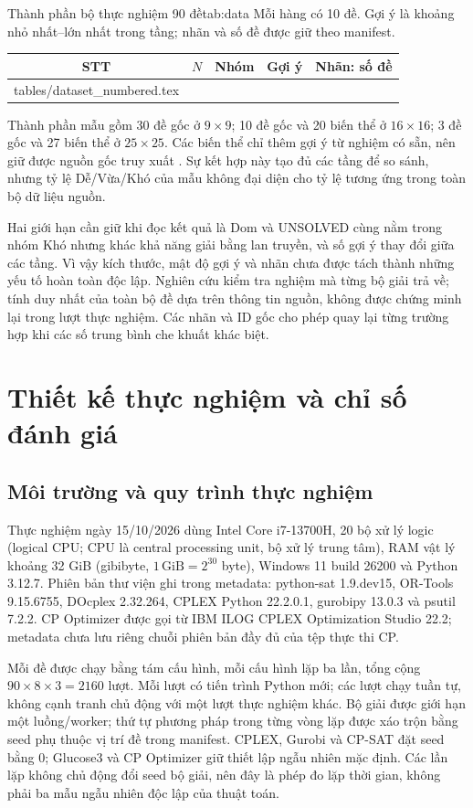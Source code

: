 \documentclass[a4paper]{cas-sc}
\makeatletter
\newcommand{\tableinput}[1]{\@@input #1 }
\makeatother
\begin{document}
\begin{reporttable}{Thành phần bộ thực nghiệm 90 đề}{tab:data}{%
Mỗi hàng có 10 đề. Gợi ý là khoảng nhỏ nhất--lớn nhất trong tầng; nhãn và số đề được giữ theo manifest.}
\begin{tabularx}{.82\linewidth}{|c|c|c|c|Y|}
\hline
\textbf{STT} & $N$ & \textbf{Nhóm} & \textbf{Gợi ý} & \textbf{Nhãn: số đề}\\\hline
\tableinput{tables/dataset_numbered.tex}
\hline
\end{tabularx}
\end{reporttable}

Thành phần mẫu gồm 30 đề gốc ở $9\times9$; 10 đề gốc và 20 biến thể ở $16\times16$; 3 đề gốc và 27 biến thể ở $25\times25$. Các biến thể chỉ thêm gợi ý từ nghiệm có sẵn, nên giữ được nguồn gốc truy xuất \citep{corpus}. Sự kết hợp này tạo đủ các tầng để so sánh, nhưng tỷ lệ Dễ/Vừa/Khó của mẫu không đại diện cho tỷ lệ tương ứng trong toàn bộ dữ liệu nguồn.

Hai giới hạn cần giữ khi đọc kết quả là Dom và UNSOLVED cùng nằm trong nhóm Khó nhưng khác khả năng giải bằng lan truyền, và số gợi ý thay đổi giữa các tầng. Vì vậy kích thước, mật độ gợi ý và nhãn chưa được tách thành những yếu tố hoàn toàn độc lập. Nghiên cứu kiểm tra nghiệm mà từng bộ giải trả về; tính duy nhất của toàn bộ đề dựa trên thông tin nguồn, không được chứng minh lại trong lượt thực nghiệm. Các nhãn và ID gốc cho phép quay lại từng trường hợp khi các số trung bình che khuất khác biệt.

\section{Thiết kế thực nghiệm và chỉ số đánh giá}
\subsection{Môi trường và quy trình thực nghiệm}
Thực nghiệm ngày 15/10/2026 dùng Intel Core i7-13700H, 20 bộ xử lý logic (logical CPU; CPU là central processing unit, bộ xử lý trung tâm), RAM vật lý khoảng 32 GiB (gibibyte, $1\,\mathrm{GiB}=2^{30}$ byte), Windows 11 build 26200 và Python 3.12.7. Phiên bản thư viện ghi trong metadata: python-sat 1.9.dev15, OR-Tools 9.15.6755, DOcplex 2.32.264, CPLEX Python 22.2.0.1, gurobipy 13.0.3 và psutil 7.2.2. CP Optimizer được gọi từ IBM ILOG CPLEX Optimization Studio 22.2; metadata chưa lưu riêng chuỗi phiên bản đầy đủ của tệp thực thi CP.

Mỗi đề được chạy bằng tám cấu hình, mỗi cấu hình lặp ba lần, tổng cộng $90\times8\times3=2160$ lượt. Mỗi lượt có tiến trình Python mới; các lượt chạy tuần tự, không cạnh tranh chủ động với một lượt thực nghiệm khác. Bộ giải được giới hạn một luồng/worker; thứ tự phương pháp trong từng vòng lặp được xáo trộn bằng seed phụ thuộc vị trí đề trong manifest. CPLEX, Gurobi và CP-SAT đặt seed bằng 0; Glucose3 và CP Optimizer giữ thiết lập ngẫu nhiên mặc định. Các lần lặp không chủ động đổi seed bộ giải, nên đây là phép đo lặp thời gian, không phải ba mẫu ngẫu nhiên độc lập của thuật toán.
\end{document}
